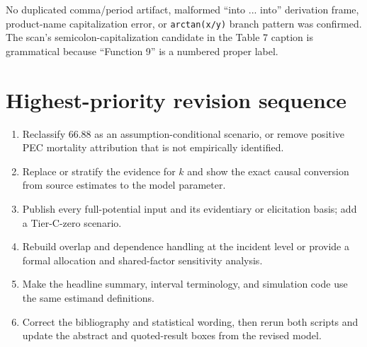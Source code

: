 \documentclass[11pt]{article}
\begin{document}
No duplicated comma/period artifact, malformed ``into ... into'' derivation
frame, product-name capitalization error, or \texttt{arctan(x/y)} branch pattern
was confirmed.  The scan's semicolon-capitalization candidate in the Table 7
caption is grammatical because ``Function 9'' is a numbered proper label.

\section*{Highest-priority revision sequence}

\begin{enumerate}
\item Reclassify $66.88$ as an assumption-conditional scenario, or remove
positive PEC mortality attribution that is not empirically identified.
\item Replace or stratify the evidence for $k$ and show the exact causal
conversion from source estimates to the model parameter.
\item Publish every full-potential input and its evidentiary or elicitation
basis; add a Tier-C-zero scenario.
\item Rebuild overlap and dependence handling at the incident level or provide
a formal allocation and shared-factor sensitivity analysis.
\item Make the headline summary, interval terminology, and simulation code use
the same estimand definitions.
\item Correct the bibliography and statistical wording, then rerun both scripts
and update the abstract and quoted-result boxes from the revised model.
\end{enumerate}
\end{document}
